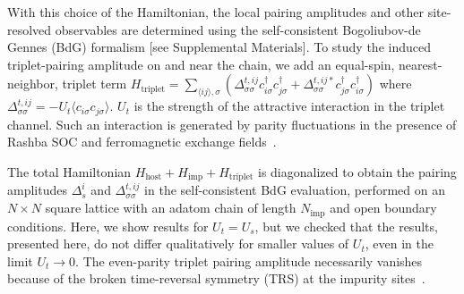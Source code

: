 \documentclass[aps,prl,reprint,nobibnotes]{revtex4-1}
\begin{document}
With this choice of the Hamiltonian, the local pairing amplitudes and other site-resolved observables are determined using the self-consistent Bogoliubov-de Gennes (BdG) formalism [see Supplemental Materials]. To study the induced triplet-pairing amplitude on and near the chain, we add an equal-spin, nearest-neighbor, triplet term $H_{\text{triplet}}=\sum_{\langle ij \rangle, \sigma} (\Delta_{\sigma \sigma}^{t,ij} c_{i\sigma}^{\dagger} c_{j\sigma}^{\dagger}+\Delta_{\sigma \sigma}^{t,ij*} c_{j\sigma}^{\dagger} c_{i\sigma}^{\dagger})$ where $\Delta_{\sigma \sigma}^{t,ij}=-U_t \langle c_{i\sigma} c_{j\sigma} \rangle$. $U_t$ is the strength of the attractive interaction in the triplet channel. Such an interaction is generated by parity fluctuations in the presence of Rashba SOC and ferromagnetic exchange fields~\cite{PhysRevLett.115.207002}. 


The total Hamiltonian $H_{\text{host}}+H_{\text{imp}}+H_{\text{triplet}}$ is diagonalized to obtain the pairing amplitudes $\Delta_s^i$ and $\Delta_{\sigma \sigma}^{t,ij}$ in the self-consistent BdG evaluation, performed on an $N \times N$ square lattice with an adatom chain of length $N_{\text{imp}}$ and open boundary conditions. Here, we show results for $U_t=U_s$, but we checked that the results, presented here, do not differ qualitatively for smaller values of $U_t$, even in the limit $U_t \rightarrow 0$. The even-parity triplet pairing amplitude necessarily vanishes because of the broken time-reversal symmetry (TRS) at the impurity sites~\cite{Ebisu_ptep2016}.
\end{document}
